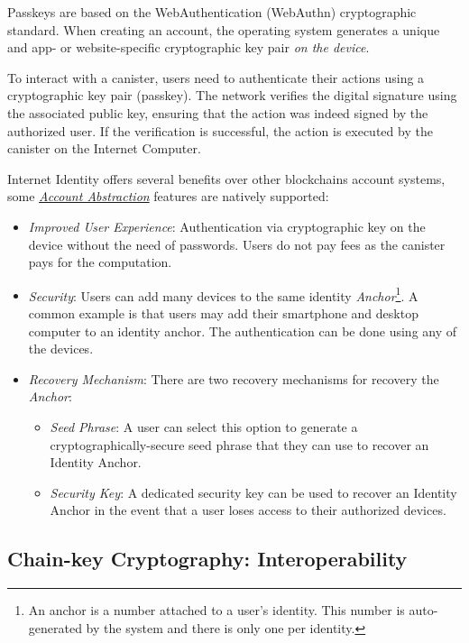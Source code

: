 Passkeys are based on the WebAuthentication (WebAuthn) cryptographic standard. When creating an account, the operating system generates a unique and app- or website-specific cryptographic key pair \textit{on the device}. \cite{icp-passkey}

To interact with a canister, users need to authenticate their actions using a cryptographic key pair (passkey). The network verifies the digital signature using the associated public key, ensuring that the action was indeed signed by the authorized user. If the verification is successful, the action is executed by the canister on the Internet Computer. \cite{icp-passkey}

Internet Identity offers several benefits over other blockchains account systems, some \hyperref[sec:account_abstraction]{\textit{Account Abstraction}} features are natively supported: \cite{icp-identity-technical}
\begin{itemize}
    \item \textit{Improved User Experience}: Authentication via cryptographic key on the device without the need of passwords. Users do not pay fees as the canister pays for the computation.
    \item \textit{Security}: Users can add many devices to the same identity \textit{Anchor}\footnote{An anchor is a number attached to a user's identity. This number is auto-generated by the system and there is only one per identity.}. A common example is that users may add their smartphone and desktop computer to an identity anchor. The authentication can be done using any of the devices.
    \item \textit{Recovery Mechanism}: There are two recovery mechanisms for recovery the \textit{Anchor}:
        \begin{itemize}
            \item \textit{Seed Phrase}: A user can select this option to generate a cryptographically-secure seed phrase that they can use to recover an Identity Anchor. 
            \item \textit{Security Key}: A dedicated security key can be used to recover an Identity Anchor in the event that a user loses access to their authorized devices. 
        \end{itemize}
\end{itemize}

\subsection{Chain-key Cryptography: Interoperability}

